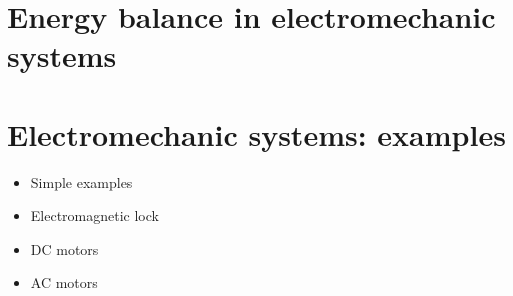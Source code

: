 \documentclass[letterpaper,10pt,english]{jupyterBook}
\begin{document}
\section{Energy balance in electromechanic systems}
\label{\detokenize{ch/systems-electromechanic-energy:energy-balance-in-electromechanic-systems}}\label{\detokenize{ch/systems-electromechanic-energy:classical-electromagnetism-systems-electromechanic-energy}}\label{\detokenize{ch/systems-electromechanic-energy::doc}}


\sphinxstepscope


\section{Electromechanic systems: examples}
\label{\detokenize{ch/systems-electromechanic-examples:electromechanic-systems-examples}}\label{\detokenize{ch/systems-electromechanic-examples:classical-electromagnetism-systems-electromechanic-examples}}\label{\detokenize{ch/systems-electromechanic-examples::doc}}\begin{itemize}
\item {} 
\sphinxAtStartPar
Simple examples

\item {} 
\sphinxAtStartPar
Electromagnetic lock

\item {} 
\sphinxAtStartPar
DC motors

\item {} 
\sphinxAtStartPar
AC motors

\end{itemize}

\sphinxstepscope
\end{document}
